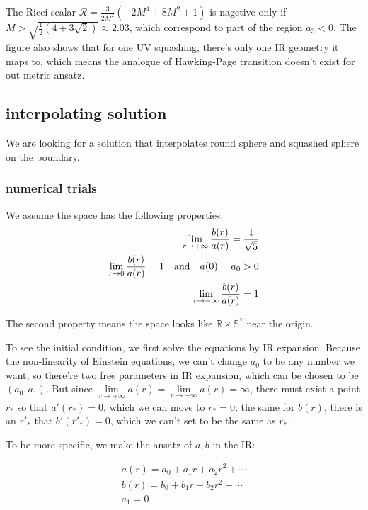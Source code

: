 \documentclass[12pt, a4paper]{article}
\numberwithin{equation}{section}
\newcommand{\be}{\begin{equation}}
\newcommand{\ee}{\end{equation}}
\newcommand{\cR}{\mathcal{R}}
\begin{document}
	The Ricci scalar $\cR = \frac{3}{2M^2}(-2M^4 + 8M^2 + 1)$ is nagetive only if $M > \sqrt{\frac{1}{2}(4+3\sqrt{2})}\approx 2.03$, which correspond to part of the region $a_3<0$. The figure also shows that for one UV squashing, there's only one IR geometry it maps to, which means the analogue of Hawking-Page transition\cite{Hawking:1983ss} doesn't exist for out metric ansatz.

		
\subsection{interpolating solution}
	We are looking for a solution that interpolates round sphere and squashed sphere on the boundary. 
	
	\subsubsection{numerical trials}
We assume the space has the following properties:
\be
\begin{aligned}
 \lim\limits_{r\rightarrow +\infty}\frac{b(r)}{a(r)} = \frac{1}{\sqrt{5}}\\
 \lim\limits_{r\rightarrow 0}\frac{b(r)}{a(r)} = 1\quad {\rm and}\quad a(0) = a_0 > 0\\
 \lim\limits_{r\rightarrow -\infty}\frac{b(r)}{a(r)} = 1\\
\end{aligned}
\ee

	The second property means the space looks like $\mathbb{R}\times \mathbb{S}^7$ near the origin. 
	
	To see the initial condition, we first solve the equations by IR expansion. Because the non-linearity of Einstein equations, we can't change $a_0$ to be any number we want, so there're two free parameters in IR expansion, which can be chosen to be $(a_0, a_1)$. But since $\lim\limits_{r\rightarrow +\infty}a(r) = \lim\limits_{r\rightarrow -\infty}a(r) = \infty$, there must exist a point $r_*$ so that $a'(r_*) = 0$, which we can move to $r_* = 0$; the same for $b(r)$, there is an $r'_*$ that $b'(r'_*) = 0$, which we can't set to be the same as $r_*$.


	
	To be more specific, we make the ansatz of $a, b$ in the IR:
	
\be
\begin{aligned}
	a(r) = a_0 + a_1 r + a_2 r^2 + \cdots\\
	b(r) = b_0 + b_1 r + b_2 r^2 + \cdots\\
	a_1 = 0\\
\end{aligned}
\ee
\end{document}
